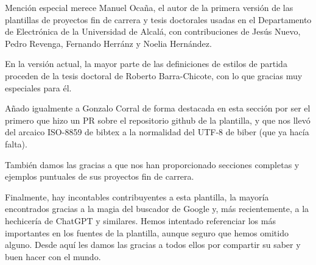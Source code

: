 Mención especial merece Manuel Ocaña, el autor de la primera versión de las plantillas de proyectos fin de carrera y tesis doctorales usadas en el Departamento de Electrónica de la Universidad de Alcalá, con contribuciones de Jesús Nuevo, Pedro Revenga, Fernando Herránz y Noelia Hernández.

En la versión actual, la mayor parte de las definiciones de estilos de partida proceden de la tesis doctoral de Roberto Barra-Chicote, con lo que gracias muy especiales para él.

Añado igualmente a Gonzalo Corral de forma destacada en esta sección por ser el primero que hizo un PR sobre el repositorio github de la plantilla, y que nos llevó del arcaico ISO-8859 de bibtex a la normalidad del UTF-8 de biber (que ya hacía falta).

También damos las gracias a  que nos han proporcionado secciones completas y ejemplos puntuales de sus proyectos fin de carrera.

Finalmente, hay incontables contribuyentes a esta plantilla, la mayoría encontrados gracias a la magia del buscador de Google y, más recientemente, a la hechicería de ChatGPT y similares. Hemos intentado referenciar los más importantes en los fuentes de la plantilla, aunque seguro que hemos omitido alguno. Desde aquí les damos las gracias a todos ellos por compartir su saber y buen hacer con el mundo.





